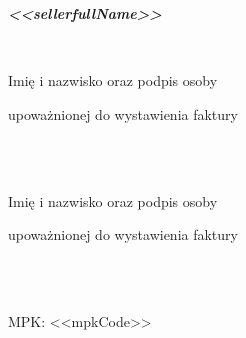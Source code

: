 \documentclass[12pt]{article}
\begin{document}
    \begin{small}
        \begin{minipage}[t]{.4\textwidth}
            \centerline{
                \textbf{\emph{<<sellerfullName>>}
                }}
            \ \\
            \vspace{-4ex}
            \hline
            \vspace{.5ex}
            \scriptsize{
                \centerline{Imię i nazwisko oraz podpis osoby}
                \centerline{upoważnionej do wystawienia faktury}
            }
        \end{minipage}
        \hfill
        \begin{minipage}[t]{.4\textwidth}
            \ \\ \\
            \vspace{-4ex}
            \hline
            \vspace{.5ex}
            \scriptsize{
                \centerline{Imię i nazwisko oraz podpis osoby}
                \centerline{upoważnionej do wystawienia faktury}
            }
        \end{minipage}

        \ \\
        \ \\

        \begin{small}
            \small{\centerline{{MPK: <<mpkCode>>}}}
        \end{small}


    \end{small}
\end{document}
